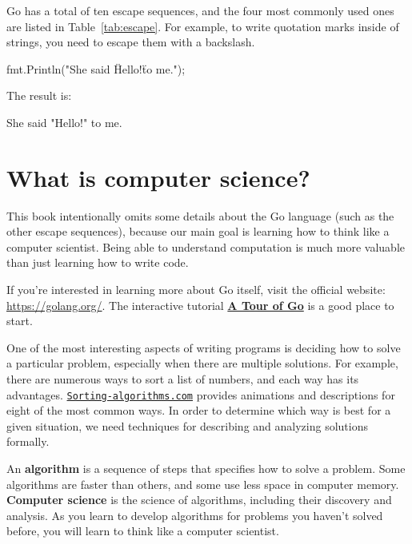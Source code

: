 Go has a total of ten escape sequences, and the four most commonly used ones are listed in Table~\ref{tab:escape}.
For example, to write quotation marks inside of strings, you need to escape them with a backslash.

\begin{code}
fmt.Println("She said \"Hello!\" to me.");
\end{code}

The result is:

\begin{stdout}
She said "Hello!" to me.
\end{stdout}


\section{What is computer science?}

This book intentionally omits some details about the Go language (such as the other escape sequences),
because our main goal is learning how to think like a computer scientist.
Being able to understand computation is much more valuable than just learning how to write code.

If you're interested in learning more about Go itself, visit the official website: \url{https://golang.org/}.
The interactive tutorial \href{https://tour.golang.org/welcome/1}{\bf A Tour of Go} is a good place to start.

One of the most interesting aspects of writing programs is deciding how to solve a particular problem, especially when there are multiple solutions.
For example, there are numerous ways to sort a list of numbers, and each way has its advantages.
\href{https://www.toptal.com/developers/sorting-algorithms/}{\tt Sorting-algorithms.com} provides animations and descriptions for eight of the most common ways.
In order to determine which way is best for a given situation, we need techniques for describing and analyzing solutions formally.


An {\bf algorithm} is a sequence of steps that specifies how to solve a problem.
Some algorithms are faster than others, and some use less space in computer memory.
{\bf Computer science} is the science of algorithms, including their discovery and analysis.
As you learn to develop algorithms for problems you haven't solved before, you will learn to think like a computer scientist.

